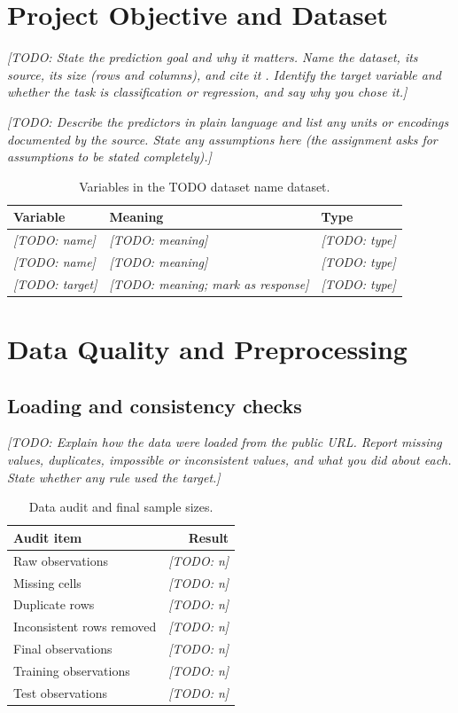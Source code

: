 \documentclass[11pt]{article}
\newcommand{\datasetname}{TODO dataset name}
\DeclareRobustCommand{\todo}[1]{{\color{red}\textit{[TODO: #1]}}}
\begin{document}
\section{Project Objective and Dataset}

\todo{State the prediction goal and why it matters. Name the dataset, its source, its size
(rows and columns), and cite it \citep{dataset}. Identify the
target variable and whether the task is classification or regression, and say why you chose
it.}

\todo{Describe the predictors in plain language and list any units or encodings documented by
the source. State any assumptions here (the assignment asks for assumptions to be stated
completely).}

\begin{table}[H]
\centering
\caption{Variables in the \datasetname{} dataset.}
\label{tab:variables}
\small
\begin{tabularx}{0.92\textwidth}{lXl}
\toprule
Variable & Meaning & Type \\
\midrule
\todo{name} & \todo{meaning} & \todo{type} \\
\todo{name} & \todo{meaning} & \todo{type} \\
\todo{target} & \todo{meaning; mark as response} & \todo{type} \\
\bottomrule
\end{tabularx}
\end{table}

\section{Data Quality and Preprocessing}

\subsection{Loading and consistency checks}

\todo{Explain how the data were loaded from the public URL. Report missing values,
duplicates, impossible or inconsistent values, and what you did about each. State
whether any rule used the target.}

\begin{table}[H]
\centering
\caption{Data audit and final sample sizes.}
\label{tab:audit}
\begin{tabular}{lr}
\toprule
Audit item & Result \\
\midrule
Raw observations & \todo{n} \\
Missing cells & \todo{n} \\
Duplicate rows & \todo{n} \\
Inconsistent rows removed & \todo{n} \\
Final observations & \todo{n} \\
Training observations & \todo{n} \\
Test observations & \todo{n} \\
\bottomrule
\end{tabular}
\end{table}
\end{document}
